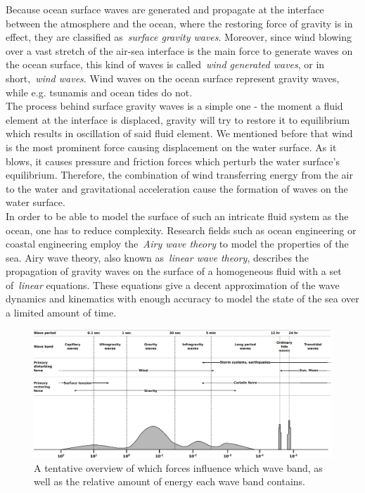 Because ocean surface waves are generated and propagate at the interface between the atmosphere
and the ocean, where the restoring force of gravity is in effect, they are classified as~\emph{surface gravity waves}.
Moreover, since wind blowing over a vast stretch of the air-sea interface is the main force to generate waves on
the ocean surface, this kind of waves is called~\emph{wind generated waves},
or in short,~\emph{wind waves}. Wind waves on the ocean surface represent
gravity waves, while e.g. tsunamis and ocean tides do not.\\

The process behind surface gravity waves is a simple one - the moment a fluid element at the interface is displaced, gravity
will try to restore it to equilibrium which results in oscillation of said fluid element. We mentioned before
that wind is the most prominent force causing displacement on the water surface. As it blows, it causes pressure and friction
forces which perturb the water surface's equilibrium. Therefore, the combination of wind transferring energy from the air
to the water and gravitational acceleration cause the formation of waves on the water surface.\\

In order to be able to model the surface of such an intricate fluid system as the ocean, one has to reduce complexity.
Research fields such as ocean engineering or coastal engineering employ the~\emph{Airy wave theory}\cite{book:airy1845tides}
to model the properties of the sea. Airy wave theory, also known as~\emph{linear wave theory}, describes the propagation of
gravity waves on the surface of a homogeneous fluid with a set of~\emph{linear} equations. These equations give
a decent approximation of the wave dynamics and kinematics with enough accuracy to model the state of the sea over a
limited amount of time.

\begin{figure}[tb]
	\centering
	\includegraphics[width=\textwidth]{figures/SurfaceWavesEnergy}
	\caption{A tentative overview of which forces influence which wave band, as well as the relative amount of energy
each wave band contains.}
	\label{fig:surface_waves_energy}
\end{figure}

